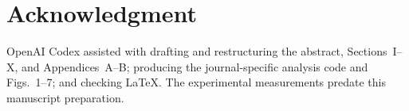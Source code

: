 \documentclass[nolineno]{ieeeaccess}
\begin{document}
\section*{Acknowledgment}
OpenAI Codex assisted with drafting and restructuring the abstract, Sections~I--X, and Appendices~A--B; producing the journal-specific analysis code and Figs.~1--7; and checking LaTeX. The experimental measurements predate this manuscript preparation.



\end{document}
